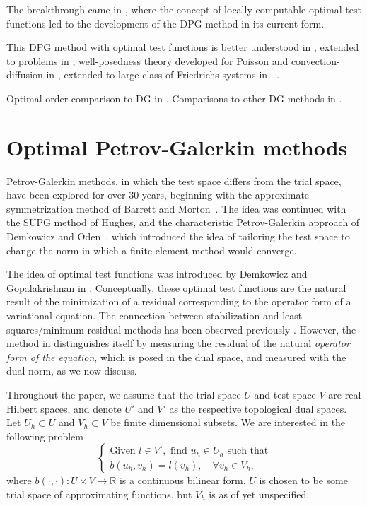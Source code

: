 \documentclass{report}
\newcommand{\eqnlab}[1]{\label{eq:#1}}
\newcommand{\seclab}[1]{\label{sec:#1}}
\newcommand{\mbb}[1]{\mathbb{#1}}
\newcommand{\LRp}[1]{\left( #1 \right)}
\begin{document}
The breakthrough came in \cite{DPG2}, where the concept of locally-computable optimal test functions led to the development of the DPG method in its current form.

This DPG method with optimal test functions is better understood in \cite{DPG3,DPG4}, extended to problems in \cite{DPGElas,stokesDPG}, well-posedness theory developed for Poisson and convection-diffusion in \cite{analysisDPG}, extended to large class of Friedrichs systems in \cite{Bui-ThanhDemkowiczGhattas11b}. \cite{practicalDPG}. 

Optimal order comparison to DG in \cite{DPG1}. Comparisons to other DG methods in \cite{Bui-ThanhDemkowiczGhattas11a,DGDPG}.

\section{Optimal Petrov-Galerkin methods}

\seclab{optimalTest} Petrov-Galerkin methods, in which the test space differs from the trial space, have been explored for over 30 years, beginning with the approximate symmetrization method of Barrett and
Morton~\cite{BARRETT01101981}. The idea was continued with the SUPG method of Hughes, and the characteristic Petrov-Galerkin approach of Demkowicz and Oden~\cite{Demkowicz1986188}, which introduced the
idea of tailoring the test space to change the norm in which a finite element method would converge.

The idea of optimal test functions was introduced by Demkowicz and Gopalakrishnan in \cite{DPG2}.  Conceptually, these optimal test functions are the natural result of the minimization of a residual corresponding to the operator form of a variational equation. The connection between stabilization and least squares/minimum residual methods has been observed previously \cite{GLS}. However, the method in \cite{DPG2} distinguishes itself by measuring the residual of the natural \textit{operator form of the equation}, which is posed in the dual space, and measured with the dual norm, as we now discuss. 	

Throughout the paper, we assume that the trial space $U$ and test space $V$ are real Hilbert spaces, and denote $U'$ and $V'$ as the respective topological dual spaces. Let $U_h \subset U$ and $V_h\subset V$ be finite dimensional subsets. We are interested in the following problem  
\begin{equation}
\eqnlab{variationEq}
\left\{
  \begin{array}{l}
    \text{Given } l \in V', \text{ find } u_h \in U_h  \text{ such that} \\ 
    b(u_h,v_h) = l(v_h), \quad \forall v_h\in V_h,
  \end{array}
  \right.
\end{equation}
where $b\LRp{\cdot,\cdot}: U \times V \to \mbb{R}$ is a continuous
bilinear form.  $U$ is chosen to be some trial space of approximating functions, but $V_h$ is as of yet unspecified. 
\end{document}
